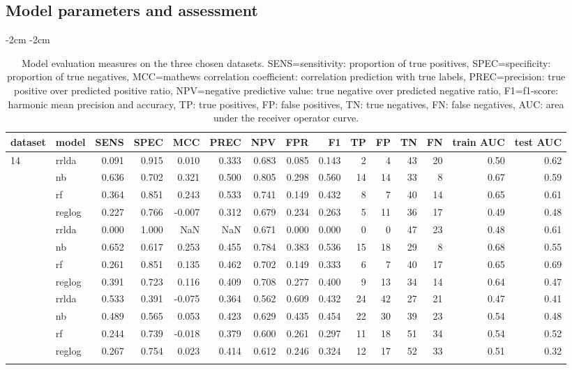\subsection{Model parameters and assessment}

\begin{table}[htpb]
\addtolength{\leftskip} {-2cm} %
\addtolength{\rightskip} {-2cm} %
\begin{tabular}{llrrrrrrrrrrrrr}
\toprule{}
dataset &model & SENS & SPEC & MCC & PREC & NPV & FPR & F1 & TP & FP & TN & FN & train AUC & test AUC\\
\midrule{}
14    & rrlda & 0.091 & 0.915 & 0.010 & 0.333 & 0.683 & 0.085 & 0.143 & 2 & 4 & 43 & 20 & 0.50 & 0.62\\
    & nb & 0.636 & 0.702 & 0.321 & 0.500 & 0.805 & 0.298 & 0.560 & 14 & 14 & 33 & 8 & 0.67 & 0.59\\
    & rf & 0.364 & 0.851 & 0.243 & 0.533 & 0.741 & 0.149 & 0.432 & 8 & 7 & 40 & 14 & 0.65 & 0.61\\
    & reglog & 0.227 & 0.766 & -0.007 & 0.312 & 0.679 & 0.234 & 0.263 & 5 & 11 & 36 & 17 & 0.49 & 0.48\\
\addlinespace
16    & rrlda & 0.000 & 1.000 & NaN & NaN & 0.671 & 0.000 & 0.000 & 0 & 0 & 47 & 23 & 0.48 & 0.61\\
    & nb & 0.652 & 0.617 & 0.253 & 0.455 & 0.784 & 0.383 & 0.536 & 15 & 18 & 29 & 8 & 0.68 & 0.55\\
    & rf & 0.261 & 0.851 & 0.135 & 0.462 & 0.702 & 0.149 & 0.333 & 6 & 7 & 40 & 17 & 0.65 & 0.69\\
    & reglog & 0.391 & 0.723 & 0.116 & 0.409 & 0.708 & 0.277 & 0.400 & 9 & 13 & 34 & 14 & 0.64 & 0.47\\
\addlinespace
19    & rrlda & 0.533 & 0.391 & -0.075 & 0.364 & 0.562 & 0.609 & 0.432 & 24 & 42 & 27 & 21 & 0.47 & 0.41\\
    & nb & 0.489 & 0.565 & 0.053 & 0.423 & 0.629 & 0.435 & 0.454 & 22 & 30 & 39 & 23 & 0.54 & 0.48\\
    & rf & 0.244 & 0.739 & -0.018 & 0.379 & 0.600 & 0.261 & 0.297 & 11 & 18 & 51 & 34 & 0.54 & 0.52\\
    & reglog & 0.267 & 0.754 & 0.023 & 0.414 & 0.612 & 0.246 & 0.324 & 12 & 17 & 52 & 33 & 0.51 & 0.32\\
\bottomrule{}
\end{tabular}
\caption{
    Model evaluation measures on the three chosen datasets.
    SENS=sensitivity: proportion of true positives,
    SPEC=specificity: proportion of true negatives,
    MCC=mathews correlation coefficient:
    correlation prediction with true labels,
    PREC=precision: true positive over predicted positive ratio,
    NPV=negative predictive value: true negative over predicted negative ratio,
    F1=f1-score: harmonic mean precision and accuracy,
    TP: true positives,
    FP: false positives,
    TN: true negatives,
    FN: false negatives,
    AUC: area under the receiver operator curve.}\label{tbl:modelEval}
\end{table}

